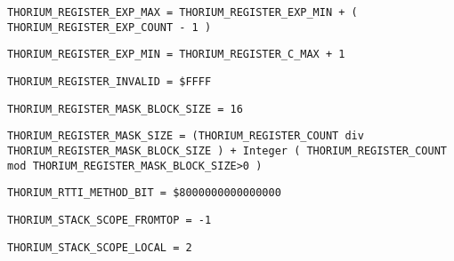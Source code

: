 \begin{verbatim}
THORIUM_REGISTER_EXP_MAX = THORIUM_REGISTER_EXP_MIN + ( THORIUM_REGISTER_EXP_COUNT - 1 )
\end{verbatim}
\label{thoriumcore:thorium:thoriumregisterexpmax}



\begin{verbatim}
THORIUM_REGISTER_EXP_MIN = THORIUM_REGISTER_C_MAX + 1
\end{verbatim}
\label{thoriumcore:thorium:thoriumregisterexpmin}



\begin{verbatim}
THORIUM_REGISTER_INVALID = $FFFF
\end{verbatim}
\label{thoriumcore:thorium:thoriumregisterinvalid}



\begin{verbatim}
THORIUM_REGISTER_MASK_BLOCK_SIZE = 16
\end{verbatim}
\label{thoriumcore:thorium:thoriumregistermaskblocksize}



\begin{verbatim}
THORIUM_REGISTER_MASK_SIZE = (THORIUM_REGISTER_COUNT div THORIUM_REGISTER_MASK_BLOCK_SIZE ) + Integer ( THORIUM_REGISTER_COUNT mod THORIUM_REGISTER_MASK_BLOCK_SIZE>0 )
\end{verbatim}
\label{thoriumcore:thorium:thoriumregistermasksize}



\begin{verbatim}
THORIUM_RTTI_METHOD_BIT = $8000000000000000
\end{verbatim}
\label{thoriumcore:thorium:thoriumrttimethodbit}



\begin{verbatim}
THORIUM_STACK_SCOPE_FROMTOP = -1
\end{verbatim}
\label{thoriumcore:thorium:thoriumstackscopefromtop}



\begin{verbatim}
THORIUM_STACK_SCOPE_LOCAL = 2
\end{verbatim}
\label{thoriumcore:thorium:thoriumstackscopelocal}



